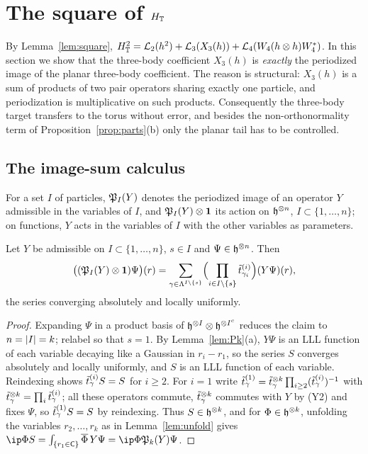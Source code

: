 \section{The square of \texorpdfstring{$H_{\mathbb{T}}$}{H\_T}}\label{sec:square}

By Lemma~\ref{lem:square}, $H_{\mathbb{T}}^2=\mathcal{L}_2(h^2)+\mathcal{L}_3(X_3(h))+\mathcal{L}_4(W_4(h\otimes h)W_4^*)$. In this section we show that the
three-body coefficient $X_3(h)$ is \emph{exactly} the periodized image of the planar three-body coefficient. The reason is
structural: $X_3(h)$ is a sum of products of two pair operators sharing exactly one particle, and periodization is
multiplicative on such products. Consequently the three-body target transfers to the torus without error, and besides the
non-orthonormality term of Proposition~\ref{prop:parts}(b) only the planar tail has to be controlled.

\subsection{The image-sum calculus}

For a set $I$ of particles, $\mathfrak{P}_I(Y)$ denotes the periodized image of an operator $Y$ admissible in the variables of $I$, and
$\mathfrak{P}_I(Y)\otimes\mathbf{1}$ its action on $\mathfrak{h}^{\otimes n}$, $I\subset\{1,\dots,n\}$; on functions, $Y$ acts in the variables of $I$ with the
other variables as parameters.

\begin{lemma}\label{lem:imagesum}
Let $Y$ be admissible on $I\subset\{1,\dots,n\}$, $s\in I$ and $\Psi\in\mathfrak{h}^{\otimes n}$. Then
\[
\bigl((\mathfrak{P}_I(Y)\otimes\mathbf{1})\Psi\bigr)(r)=\sum_{\gamma\in\Lambda^{I\setminus\{s\}}}\Bigl(\prod_{i\in I\setminus\{s\}}\tilde t^{(i)}_{\gamma_i}\Bigr)(Y\Psi)(r),
\]
the series converging absolutely and locally uniformly.
\end{lemma}

\begin{proof}
Expanding $\Psi$ in a product basis of $\mathfrak{h}^{\otimes I}\otimes\mathfrak{h}^{\otimes I^c}$ reduces the claim to $n=\lvert I\rvert=k$; relabel so that $s=1$.
By Lemma~\ref{lem:Pk}(a), $Y\Psi$ is an LLL function of each variable decaying like a Gaussian in $r_i-r_1$, so the series $S$
converges absolutely and locally uniformly, and $S$ is an LLL function of each variable. Reindexing shows
$\tilde t^{(i)}_\gamma S=S$ for $i\ge2$. For $i=1$ write $\tilde t^{(1)}_\gamma=\tilde t^{\otimes k}_\gamma\prod_{i\ge2}(\tilde t^{(i)}_\gamma)^{-1}$ with $\tilde t^{\otimes k}_\gamma=\prod_i\tilde t^{(i)}_\gamma$; all
these operators commute, $\tilde t^{\otimes k}_\gamma$ commutes with $Y$ by (Y2) and fixes $\Psi$, so $\tilde t^{(1)}_\gamma S=S$ by reindexing. Thus
$S\in\mathfrak{h}^{\otimes k}$, and for $\Phi\in\mathfrak{h}^{\otimes k}$, unfolding the variables $r_2,\dots,r_k$ as in Lemma~\ref{lem:unfold} gives
$\ip\Phi S=\int_{\{r_1\in\cell\}}\overline\Phi\,Y\Psi=\ip\Phi{\Pp_k(Y)\Psi}$.
\end{proof}

